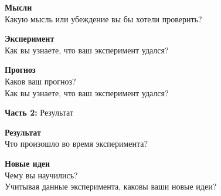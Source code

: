 \documentclass{worksheet}
\begin{document}
\begin{tcolorbox}[standard jigsaw, opacityback=0, top=0mm]

\vspace{.5\baselineskip}
\parbox[][4cm][t]{18cm}{
{\textbf{\large Мысли}} \\
Какую мысль или убеждение вы бы хотели проверить?
}
\DrawLine

\vspace{.5\baselineskip}
\parbox[][4cm][t]{18cm}{
{\textbf{\large Эксперимент}} \\
Как вы узнаете, что ваш эксперимент удался?
}

\DrawLine

\vspace{.5\baselineskip}
\parbox[][4cm][t]{18cm}{
{\textbf{\large Прогноз}} \\
Каков ваш прогноз? \\
Как вы узнаете, что ваш эксперимент удался?
\begin{tcolorbox}[standard jigsaw, enlarge by=-4mm, height=2.8cm, width=6cm, boxsep=4mm, flush right]
\end{tcolorbox}
}

\end{tcolorbox}


\begin{flushleft}
\large{\textbf{Часть 2:} Результат}
\end{flushleft}


\begin{tcolorbox}[standard jigsaw,opacityback=0, top=0mm]

\vspace{.5\baselineskip}
\parbox[][4cm][t]{18cm}{
{\textbf{\large Результат}} \\
Что произошло во время эксперимента? \\
\begin{tcolorbox}[standard jigsaw, enlarge by=-7mm, height=2.8cm, width=6cm, boxsep=4mm, flush right]
\end{tcolorbox}
}

\DrawLine

\vspace{.5\baselineskip}
\parbox[][4cm][t]{18cm}{
{\textbf{\large Новые идеи}} \\
Чему вы научились? \\
Учитывая данные эксперимента, каковы ваши новые идеи?}

\end{tcolorbox}
\end{document}

